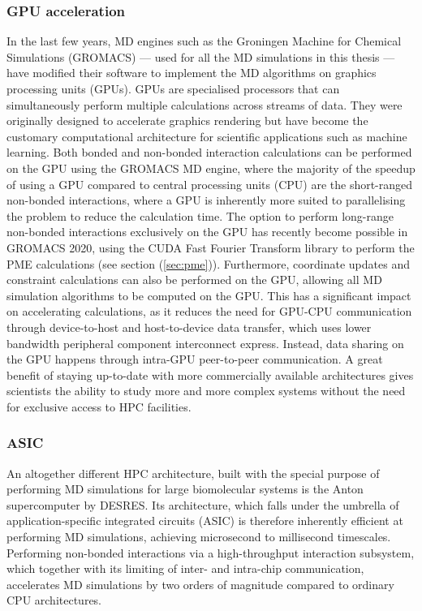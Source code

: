 \subsubsection{GPU acceleration}
In the last few years, MD engines such as the Groningen Machine for Chemical Simulations (GROMACS) --- used for all the MD simulations in this thesis --- have modified their software to implement the MD algorithms on graphics processing units (GPUs). GPUs are specialised processors that can simultaneously perform multiple calculations across streams of data. They were originally designed to accelerate graphics rendering but have become the customary computational architecture for scientific applications such as machine learning. Both bonded and non-bonded interaction calculations can be performed on the GPU using the GROMACS MD engine, where the majority of the speedup of using a GPU compared to central processing units (CPU) are the short-ranged non-bonded interactions, where a GPU is inherently more suited to parallelising the problem to reduce the calculation time. The option to perform long-range non-bonded interactions exclusively on the GPU has recently become possible in GROMACS 2020, using the CUDA Fast Fourier Transform library to perform the PME calculations (see section (\ref{sec:pme})). Furthermore, coordinate updates and constraint calculations can also be performed on the GPU, allowing all MD simulation algorithms to be computed on the GPU. This has a significant impact on accelerating calculations, as it reduces the need for GPU-CPU communication through device-to-host and host-to-device data transfer, which uses lower bandwidth peripheral component interconnect express. Instead, data sharing on the GPU happens through intra-GPU peer-to-peer communication. A great benefit of staying up-to-date with more commercially available architectures gives scientists the ability to study more and more complex systems without the need for exclusive access to HPC facilities. 

\subsubsection{ASIC}
An altogether different HPC architecture, built with the special purpose of performing MD simulations for large biomolecular systems is the Anton supercomputer by DESRES.\cite{Shaw2008} Its architecture, which falls under the umbrella of application-specific integrated circuits (ASIC) is therefore inherently efficient at performing MD simulations, achieving microsecond to millisecond timescales. Performing non-bonded interactions via a high-throughput interaction subsystem, which together with its limiting of inter- and intra-chip communication, accelerates MD simulations by two orders of magnitude compared to ordinary CPU architectures.\cite{shaw2009millisecond}

